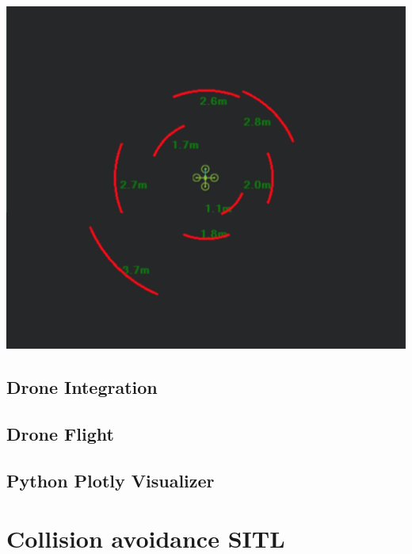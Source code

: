 
\begin{center}
    \includegraphics[width=0.65\linewidth]{./projects/logviewer/mission_planner_tower_evo.png}
\end{center}

\subsection{Drone Integration}

\subsection{Drone Flight}

\subsection{Python Plotly Visualizer}

\section{Collision avoidance SITL}

